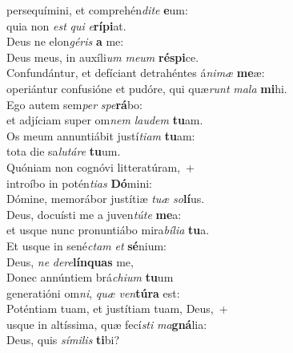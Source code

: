 \evenverse  persequímini, et comprehén\textit{di}\textit{te} \textbf{e}um:~\*\\
\evenverse quia non \textit{est} \textit{qui} \textit{e}\textbf{rí}\textbf{pi}at.\\
\oddverse Deus ne elon\textit{gé}\textit{ris} \textbf{a} me:~\*\\
\oddverse Deus meus, in auxíli\textit{um} \textit{me}\textit{um} \textbf{ré}\textbf{spi}ce.\\
\evenverse Confundántur, et defíciant detrahéntes á\textit{ni}\textit{mæ} \textbf{me}æ:~\*\\
\evenverse operiántur confusióne et pudóre, qui quæ\textit{runt} \textit{ma}\textit{la} \textbf{mi}hi.\\
\oddverse Ego autem sem\textit{per} \textit{spe}\textbf{rá}bo:~\*\\
\oddverse et adjíciam super om\textit{nem} \textit{lau}\textit{dem} \textbf{tu}am.\\
\evenverse Os meum annuntiábit justí\textit{ti}\textit{am} \textbf{tu}am:~\*\\
\evenverse tota die sa\textit{lu}\textit{tá}\textit{re} \textbf{tu}um.\\
\oddverse Quóniam non cognóvi litteratúram,~+\\
\oddverse  introíbo in potén\textit{ti}\textit{as} \textbf{Dó}mini:~\*\\
\oddverse Dómine, memorábor justítiæ \textit{tu}\textit{æ} \textit{so}\textbf{lí}us.\\
\evenverse Deus, docuísti me a juven\textit{tú}\textit{te} \textbf{me}a:~\*\\
\evenverse et usque nunc pronuntiábo mira\textit{bí}\textit{li}\textit{a} \textbf{tu}a.\\
\oddverse Et usque in sené\textit{ctam} \textit{et} \textbf{sé}nium:~\*\\
\oddverse Deus, \textit{ne} \textit{de}\textit{re}\textbf{lín}\textbf{quas} me,\\
\evenverse Donec annúntiem brá\textit{chi}\textit{um} \textbf{tu}um~\*\\
\evenverse generatióni om\textit{ni}, \textit{quæ} \textit{ven}\textbf{tú}\textbf{ra} est:\\
\oddverse Poténtiam tuam, et justítiam tuam, Deus,~+\\
\oddverse  usque in altíssima, quæ fecí\textit{sti} \textit{ma}\textbf{gná}lia:~\*\\
\oddverse Deus, quis \textit{sí}\textit{mi}\textit{lis} \textbf{ti}bi?\\
